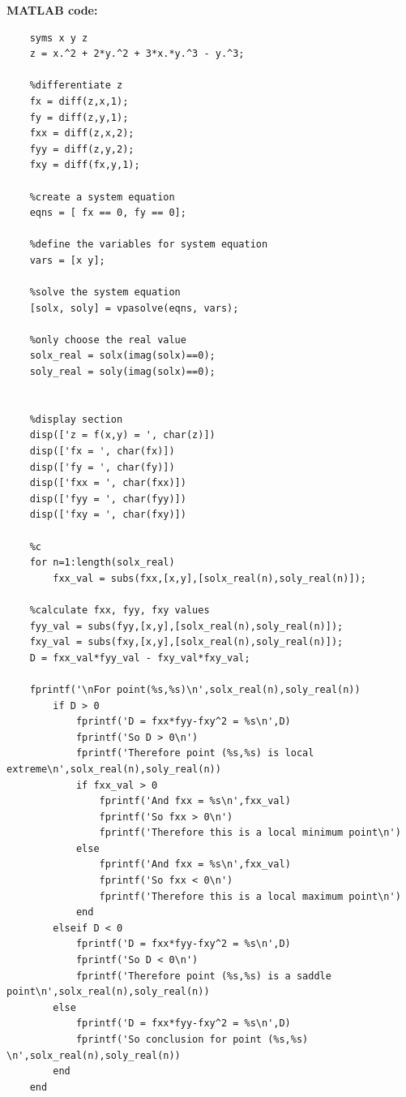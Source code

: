 \textbf {MATLAB code: }
\begin{lstlisting}[style=Matlab-editor]
    %calculation
    syms x y z
    z = x.^2 + 2*y.^2 + 3*x.*y.^3 - y.^3;
    
    %differentiate z 
    fx = diff(z,x,1);   
    fy = diff(z,y,1);
    fxx = diff(z,x,2);
    fyy = diff(z,y,2);
    fxy = diff(fx,y,1);
    
    %create a system equation
    eqns = [ fx == 0, fy == 0];
    
    %define the variables for system equation
    vars = [x y];
    
    %solve the system equation
    [solx, soly] = vpasolve(eqns, vars);
    
    %only choose the real value
    solx_real = solx(imag(solx)==0);
    soly_real = soly(imag(solx)==0);
     
     
    %display section
    disp(['z = f(x,y) = ', char(z)])
    disp(['fx = ', char(fx)])
    disp(['fy = ', char(fy)])
    disp(['fxx = ', char(fxx)])
    disp(['fyy = ', char(fyy)])
    disp(['fxy = ', char(fxy)])
     
    %c
    for n=1:length(solx_real)
        fxx_val = subs(fxx,[x,y],[solx_real(n),soly_real(n)]);
    
    %calculate fxx, fyy, fxy values
    fyy_val = subs(fyy,[x,y],[solx_real(n),soly_real(n)]);
    fxy_val = subs(fxy,[x,y],[solx_real(n),soly_real(n)]);
    D = fxx_val*fyy_val - fxy_val*fxy_val;
    
    fprintf('\nFor point(%s,%s)\n',solx_real(n),soly_real(n))
        if D > 0
            fprintf('D = fxx*fyy-fxy^2 = %s\n',D)
            fprintf('So D > 0\n')
            fprintf('Therefore point (%s,%s) is local extreme\n',solx_real(n),soly_real(n))
            if fxx_val > 0
                fprintf('And fxx = %s\n',fxx_val)
                fprintf('So fxx > 0\n')
                fprintf('Therefore this is a local minimum point\n')
            else
                fprintf('And fxx = %s\n',fxx_val)
                fprintf('So fxx < 0\n')
                fprintf('Therefore this is a local maximum point\n')
            end
        elseif D < 0
            fprintf('D = fxx*fyy-fxy^2 = %s\n',D)
            fprintf('So D < 0\n')
            fprintf('Therefore point (%s,%s) is a saddle point\n',solx_real(n),soly_real(n))
        else
            fprintf('D = fxx*fyy-fxy^2 = %s\n',D)
            fprintf('So conclusion for point (%s,%s) \n',solx_real(n),soly_real(n))
        end
    end    
\end{lstlisting}


